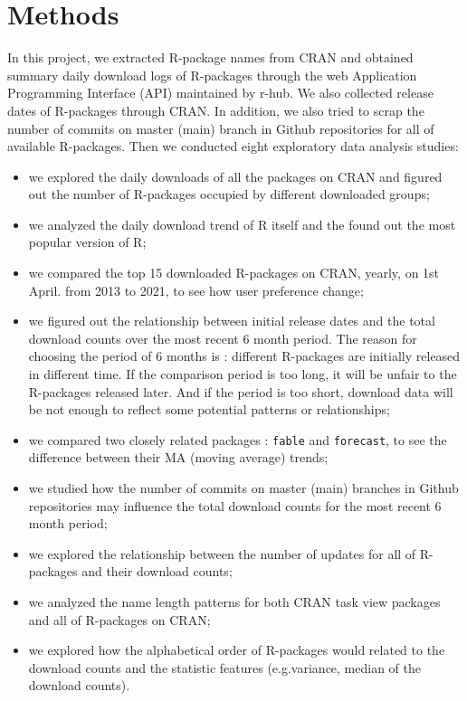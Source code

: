 \documentclass[
]{book}
\begin{document}
\hypertarget{methods}{%
\chapter{Methods}\label{methods}}

In this project, we extracted R-package names from CRAN and obtained summary daily download logs of R-packages through the web Application Programming Interface (API) maintained by r-hub\autocite{rhub}. We also collected release dates of R-packages through CRAN. In addition, we also tried to scrap the number of commits on master (main) branch in Github repositories for all of available R-packages. Then we conducted eight exploratory data analysis studies:

\begin{itemize}
\item
  we explored the daily downloads of all the packages on CRAN and figured out the number of R-packages occupied by different downloaded groups;
\item
  we analyzed the daily download trend of R itself and the found out the most popular version of R;
\item
  we compared the top 15 downloaded R-packages on CRAN, yearly, on 1st April. from 2013 to 2021, to see how user preference change;
\item
  we figured out the relationship between initial release dates and the total download counts over the most recent 6 month period. The reason for choosing the period of 6 months is : different R-packages are initially released in different time. If the comparison period is too long, it will be unfair to the R-packages released later. And if the period is too short, download data will be not enough to reflect some potential patterns or relationships;
\item
  we compared two closely related packages : \texttt{fable} and \texttt{forecast}, to see the difference between their MA (moving average) trends;
\item
  we studied how the number of commits on master (main) branches in Github repositories may influence the total download counts for the most recent 6 month period;
\item
  we explored the relationship between the number of updates for all of R-packages and their download counts;
\item
  we analyzed the name length patterns for both CRAN task view packages and all of R-packages on CRAN;
\item
  we explored how the alphabetical order of R-packages would related to the download counts and the statistic features (e.g.variance, median of the download counts).
\end{itemize}
\end{document}

